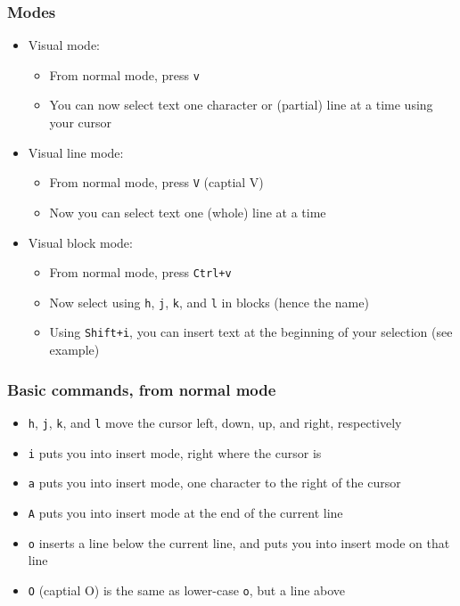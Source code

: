 \documentclass{beamer}
\begin{document}
\begin{frame}
    \frametitle{Modes}
    \begin{itemize}
        \item Visual mode:
        \begin{itemize}
            \item From normal mode, press \texttt{v}
            \item You can now select text one character or (partial) line at a time using your cursor
        \end{itemize}
        \pause
        \item Visual line mode:
        \begin{itemize}
            \item From normal mode, press \texttt{V} (captial V)
            \item Now you can select text one (whole) line at a time
        \end{itemize}
        \pause
        \item Visual block mode:
        \begin{itemize}
            \item From normal mode, press \texttt{Ctrl+v}
            \item Now select using \texttt{h}, \texttt{j}, \texttt{k}, and \texttt{l} in blocks (hence the name)
            \item Using \texttt{Shift+i}, you can insert text at the beginning of your selection (see example)
        \end{itemize}
    \end{itemize}
\end{frame}

\begin{frame}
    \frametitle{Basic commands, from normal mode}
    \pause
    \begin{itemize}
        \item \texttt{h}, \texttt{j}, \texttt{k}, and \texttt{l} move the cursor left, down, up, and right, respectively
        \pause
        \item \texttt{i} puts you into insert mode, right where the cursor is
        \pause
        \item \texttt{a} puts you into insert mode, one character to the right of the cursor
        \item \texttt{A} puts you into insert mode at the end of the current line
        \pause
        \item \texttt{o} inserts a line below the current line, and puts you into insert mode on that line
        \item \texttt{O} (captial O) is the same as lower-case \texttt{o}, but a line above
    \end{itemize}
\end{frame}
\end{document}
